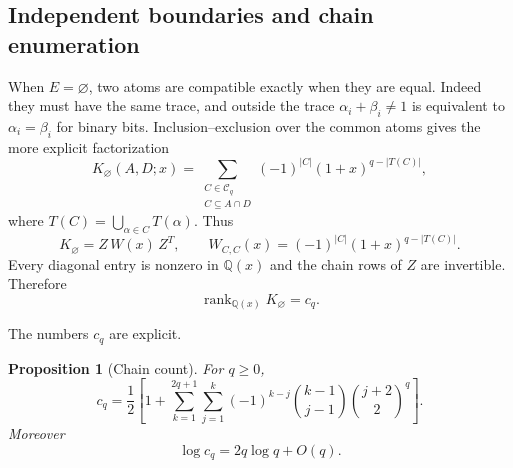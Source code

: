 \documentclass[11pt,reqno]{amsart}
\newtheorem{proposition}[proposition]{Proposition}
\theoremstyle{definition}
\begin{document}
\subsection{Independent boundaries and chain enumeration}

When $E=\varnothing$, two atoms are compatible exactly when they are equal.
Indeed they must have the same trace, and outside the trace
$\alpha_i+\beta_i\ne1$ is equivalent to $\alpha_i=\beta_i$ for binary bits.
Inclusion--exclusion over the common atoms gives the more explicit
factorization
\begin{equation}\label{eq:independent-chain-factor}
 K_{\varnothing}(A,D;x)
 =\sum_{\substack{C\in\mathcal C_q\\C\subseteq A\cap D}}
 (-1)^{|C|}(1+x)^{q-|T(C)|},
\end{equation}
where $T(C)=\bigcup_{\alpha\in C}T(\alpha)$.  Thus
\[
 K_{\varnothing}=Z\,W(x)\,Z^T,
 \qquad
 W_{C,C}(x)=(-1)^{|C|}(1+x)^{q-|T(C)|}.
\]
Every diagonal entry is nonzero in $\mathbb Q(x)$ and the chain rows of $Z$
are invertible.  Therefore
\begin{equation}\label{eq:independent-universal-rank}
 \operatorname{rank}_{\mathbb Q(x)}K_{\varnothing}=c_q.
\end{equation}

The numbers $c_q$ are explicit.

\begin{proposition}[Chain count]\label{prop:chain-count}
For $q\ge0$,
\begin{equation}\label{eq:cq-formula}
 \boxed{
 c_q=\frac12\left[1+\sum_{k=1}^{2q+1}\sum_{j=1}^k
 (-1)^{k-j}\binom{k-1}{j-1}\binom{j+2}{2}^{q}\right].
 }
\end{equation}
Moreover
\[
 \log c_q=2q\log q+O(q).
\]
\end{proposition}
\end{document}

